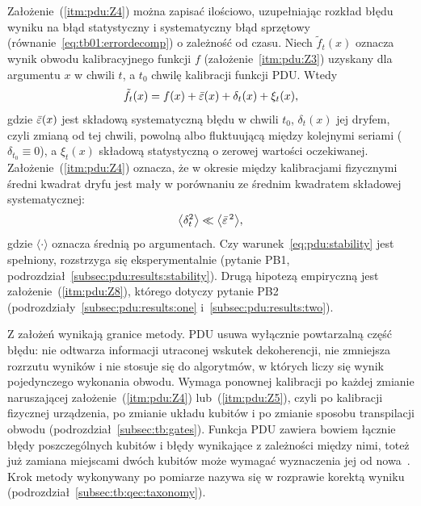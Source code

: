 Założenie~(\ref{itm:pdu:Z4}) można zapisać ilościowo, uzupełniając rozkład błędu wyniku na błąd statystyczny i systematyczny błąd sprzętowy (równanie~\eqref{eq:tb01:errordecomp}) o zależność od czasu.
Niech $\tilde{f}_t(x)$ oznacza wynik obwodu kalibracyjnego funkcji $f$ (założenie~\ref{itm:pdu:Z3}) uzyskany dla argumentu $x$ w chwili $t$, a $t_0$ chwilę kalibracji funkcji PDU.
Wtedy
\begin{equation}\label{eq:pdu:decomposition}
\tilde{f}_t(x)=f(x)+\bar{\varepsilon}(x)+\delta_t(x)+\xi_t(x),
\end{equation}
gdzie $\bar{\varepsilon}(x)$ jest składową systematyczną błędu w chwili $t_0$, $\delta_t(x)$ jej dryfem, czyli zmianą od tej chwili, powolną albo fluktuującą między kolejnymi seriami ($\delta_{t_0}\equiv 0$), a $\xi_t(x)$ składową statystyczną o zerowej wartości oczekiwanej.
Założenie~(\ref{itm:pdu:Z4}) oznacza, że w okresie między kalibracjami fizycznymi średni kwadrat dryfu jest mały w porównaniu ze średnim kwadratem składowej systematycznej:
\begin{equation}\label{eq:pdu:stability}
\bigl\langle\delta_t^2\bigr\rangle\ll\bigl\langle\bar{\varepsilon}^{\,2}\bigr\rangle,
\end{equation}
gdzie $\langle\cdot\rangle$ oznacza średnią po argumentach.
Czy warunek~\eqref{eq:pdu:stability} jest spełniony, rozstrzyga się eksperymentalnie (pytanie PB1, podrozdział~\ref{subsec:pdu:results:stability}).
Drugą hipotezą empiryczną jest założenie~(\ref{itm:pdu:Z8}), którego dotyczy pytanie PB2 (podrozdziały~\ref{subsec:pdu:results:one} i~\ref{subsec:pdu:results:two}).

Z założeń wynikają granice metody.
PDU usuwa wyłącznie powtarzalną część błędu: nie odtwarza informacji utraconej wskutek dekoherencji, nie zmniejsza rozrzutu wyników i nie stosuje się do algorytmów, w których liczy się wynik pojedynczego wykonania obwodu.
Wymaga ponownej kalibracji po każdej zmianie naruszającej założenie~(\ref{itm:pdu:Z4}) lub~(\ref{itm:pdu:Z5}), czyli po kalibracji fizycznej urządzenia, po zmianie układu kubitów i po zmianie sposobu transpilacji obwodu (podrozdział~\ref{subsec:tb:gates}).
Funkcja PDU zawiera bowiem łącznie błędy poszczególnych kubitów i błędy wynikające z zależności między nimi, toteż już zamiana miejscami dwóch kubitów może wymagać wyznaczenia jej od nowa~\cite{werner_experiment_driven_2022,werner_magisterka_2022}.
Krok metody wykonywany po pomiarze nazywa się w rozprawie korektą wyniku (podrozdział~\ref{subsec:tb:qec:taxonomy}).

